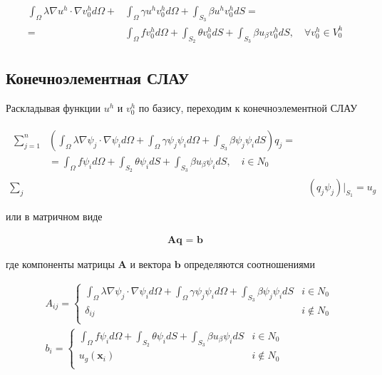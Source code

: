 \documentclass[12pt, a4paper]{article}
\begin{document}
\begin{align}
  \begin{split}\label{3}
       \int_{\Omega}\lambda\nabla{u^h}\cdot\nabla{v_0^h}d\Omega 
    + &\int_{\Omega}\gamma u^h v_0^h d\Omega
    +  \int_{S_3}\beta u^h v_0^h dS = \\
    = &\int_{\Omega}fv_0^hd\Omega + 
       \int_{S_2}\theta v_0^hdS + 
       \int_{S_3}\beta u_{\beta}v_0^hdS,
      \quad \forall v_0^h \in V_0^h
  \end{split}
\end{align}

\subsection{Конечноэлементная СЛАУ}

\noindent Раскладывая функции $u^h$ и $v_0^h$ по базису, переходим к конечноэлементной СЛАУ

\begin{align}
  \begin{split}
    \sum_{j=1}^{n}&(
      \int_{\Omega}\lambda\nabla{\psi_j}\cdot\nabla{\psi_i}d\Omega 
    + \int_{\Omega}\gamma \psi_j \psi_i d\Omega
    + \int_{S_3}\beta \psi_j \psi_i dS
  ) q_j = \\
    &= \int_{\Omega}f \psi_i d\Omega 
    + \int_{S_2}\theta \psi_i dS 
    + \int_{S_3}\beta u_{\beta} \psi_i dS,
  \quad i \in N_0
  \end{split} \\[1ex]
  \sum_{j}&(q_j \psi_j)\bigg\rvert_{S_1} = u_g
\end{align}

\vspace{3mm}
\noindent или в матричном виде

\begin{align}
    \textbf{Aq = b}
\end{align}

\vspace{3mm}
\noindent где компоненты матрицы $\textbf{A}$ и вектора $\textbf{b}$ определяются соотношениями

\begin{align}
  &A_{ij} = 
  \begin{cases} 
      \int_{\Omega}\lambda\nabla{\psi_j}\cdot\nabla{\psi_i}d\Omega 
        + \int_{\Omega}\gamma \psi_j \psi_i d\Omega
        + \int_{S_3}\beta \psi_j \psi_i dS & i \in N_0 \\
      \delta_{ij} & i \notin N_0 \\
  \end{cases} \\[1ex]
  &b_i =
  \begin{cases} 
      \int_{\Omega}f \psi_i d\Omega 
        + \int_{S_2}\theta \psi_i dS 
        + \int_{S_3}\beta u_{\beta} \psi_i dS & i \in N_0 \\
      u_g(\textbf{x}_i) & i \notin N_0 \\
  \end{cases}
\end{align}
\end{document}

